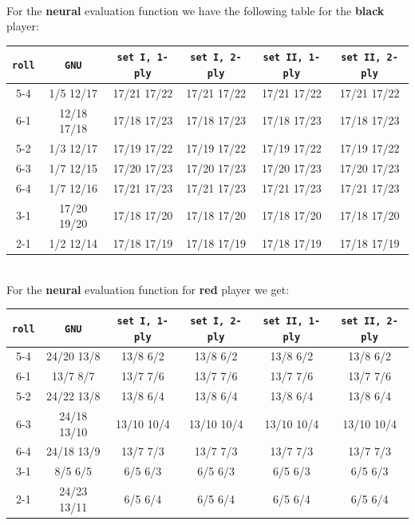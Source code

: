 \documentclass[11pt, a4paper, twoside]{amsart} %
\theoremstyle{definition}
\begin{document}
\text{}\\
For the \textbf{neural} evaluation function we have the following table for the \textbf{black} player:
\begin{center}
\begin{tabular}{ | c | c | c | c | c | c | }
\hline
\texttt{roll} & \texttt{GNU} & \texttt{set I, 1-ply} & \texttt{set I, 2-ply} & \texttt{set II, 1-ply} & \texttt{set II, 2-ply}\\ \hline
5-4 & 1/5 12/17 & 17/21 17/22 & 17/21 17/22 & 17/21 17/22 & 17/21 17/22\\ \hline
6-1 & 12/18 17/18 & 17/18 17/23 & 17/18 17/23 & 17/18 17/23 & 17/18 17/23\\ \hline
5-2 & 1/3 12/17 & 17/19 17/22 & 17/19 17/22 & 17/19 17/22 & 17/19 17/22\\ \hline
6-3 & 1/7 12/15 & 17/20 17/23 & 17/20 17/23 & 17/20 17/23 & 17/20 17/23\\ \hline
6-4 & 1/7 12/16 & 17/21 17/23 & 17/21 17/23 & 17/21 17/23 & 17/21 17/23\\ \hline
3-1 & 17/20 19/20 & 17/18 17/20 & 17/18 17/20 & 17/18 17/20 & 17/18 17/20\\ \hline
2-1 & 1/2 12/14 & 17/18 17/19 & 17/18 17/19 & 17/18 17/19 & 17/18 17/19\\ \hline
\end{tabular}
\end{center}
\text{}\\
For the \textbf{neural} evaluation function for \textbf{red} player we get:
\begin{center}
\begin{tabular}{ | c | c | c | c | c | c | }
\hline
\texttt{roll} & \texttt{GNU} & \texttt{set I, 1-ply} & \texttt{set I, 2-ply} & \texttt{set II, 1-ply} & \texttt{set II, 2-ply}\\ \hline
5-4 & 24/20 13/8 & 13/8 6/2 & 13/8 6/2 & 13/8 6/2 & 13/8 6/2\\ \hline
6-1 & 13/7 8/7 & 13/7 7/6 & 13/7 7/6 & 13/7 7/6 & 13/7 7/6\\ \hline
5-2 & 24/22 13/8 & 13/8 6/4 & 13/8 6/4 & 13/8 6/4 & 13/8 6/4\\ \hline
6-3 & 24/18 13/10 & 13/10 10/4 & 13/10 10/4 & 13/10 10/4 & 13/10 10/4\\ \hline
6-4 & 24/18 13/9 & 13/7 7/3 & 13/7 7/3 & 13/7 7/3 & 13/7 7/3\\ \hline
3-1 & 8/5 6/5 & 6/5 6/3 & 6/5 6/3 & 6/5 6/3 & 6/5 6/3\\ \hline
2-1 & 24/23 13/11 & 6/5 6/4 & 6/5 6/4 & 6/5 6/4 & 6/5 6/4\\ \hline
\end{tabular}
\end{center}
\end{document}
